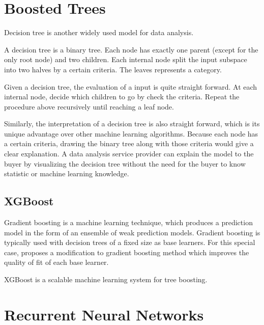\section{Boosted Trees}

        Decision tree is another widely used model for data analysis.

        A decision tree is a binary tree.
        Each node has exactly one parent (except for the only root node) and two children.
        Each internal node split the input subspace into two halves by a certain criteria.
        The leaves represents a category.

        Given a decision tree, the evaluation of a input is quite straight forward.
        At each internal node, decide which children to go by check the criteria.
        Repeat the procedure above recursively until reaching a leaf node.

        Similarly, the interpretation of a decision tree is also straight forward,
        which is its unique advantage over other machine learning algorithms.
        Because each node has a certain criteria,
        drawing the binary tree along with those criteria would give a clear explanation.
        A data analysis service provider can explain the model to the buyer by visualizing
        the decision tree without the need for the buyer to know statistic or machine learning knowledge.

    \subsection{XGBoost}

        Gradient boosting is a machine learning technique,
        which produces a prediction model in the form of an ensemble of weak prediction models.
        Gradient boosting is typically used with decision trees of a fixed size as base learners.
        For this special case, \cite{Friedman2001} proposes a modification to gradient boosting method
        which improves the quality of fit of each base learner.

        XGBoost is a scalable machine learning system for tree boosting. \cite{Chen2016}


\section{Recurrent Neural Networks}

